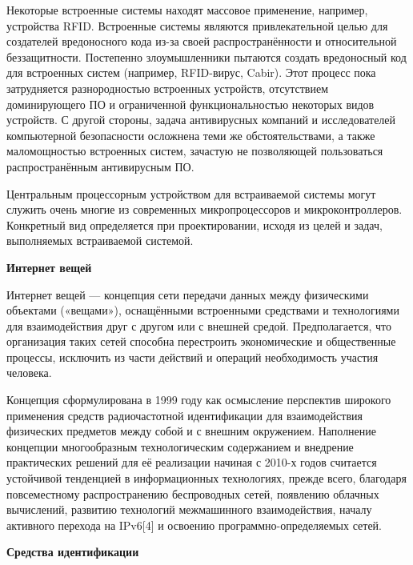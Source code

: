   Некоторые встроенные системы находят массовое применение, например, устройства RFID. Встроенные системы являются привлекательной целью для создателей вредоносного кода из-за своей распространённости и относительной беззащитности. Постепенно злоумышленники пытаются создать вредоносный код для встроенных систем (например, RFID-вирус, Cabir). Этот процесс пока затрудняется разнородностью встроенных устройств, отсутствием доминирующего ПО и ограниченной функциональностью некоторых видов устройств. С другой стороны, задача антивирусных компаний и исследователей компьютерной безопасности осложнена теми же обстоятельствами, а также маломощностью встроенных систем, зачастую не позволяющей пользоваться распространённым антивирусным ПО.

  Центральным процессорным устройством для встраиваемой системы могут служить очень многие из современных микропроцессоров и микроконтроллеров. Конкретный вид определяется при проектировании, исходя из целей и задач, выполняемых встраиваемой системой.

  \begin{center}{\bfseries Интернет вещей}
  \end{center}

  \begin{opr}
    Интернет вещей — концепция сети передачи данных между физическими объектами («вещами»), оснащёнными встроенными средствами и технологиями для взаимодействия друг с другом или с внешней средой. Предполагается, что организация таких сетей способна перестроить экономические и общественные процессы, исключить из части действий и операций необходимость участия человека.
  \end{opr}

  Концепция сформулирована в 1999 году как осмысление перспектив широкого применения средств радиочастотной идентификации для взаимодействия физических предметов между собой и с внешним окружением. Наполнение концепции многообразным технологическим содержанием и внедрение практических решений для её реализации начиная с 2010-х годов считается устойчивой тенденцией в информационных технологиях, прежде всего, благодаря повсеместному распространению беспроводных сетей, появлению облачных вычислений, развитию технологий межмашинного взаимодействия, началу активного перехода на IPv6[4] и освоению программно-определяемых сетей.

  \begin{center}{\bfseries Средства идентификации}
  \end{center} 

